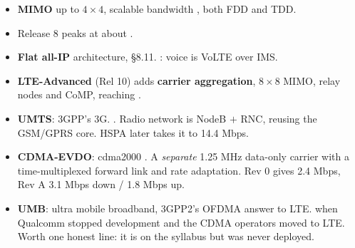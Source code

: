 {\begin{itemize}
        handset amplifier needs (Ch 4 \S4.6).
  \item \textbf{MIMO} up to $4\times4$, scalable bandwidth
        , both FDD and TDD.
  \item Release 8 peaks at about .
  \item \textbf{Flat all-IP} architecture, \S8.11. : voice is
        VoLTE over IMS.
  \item \textbf{LTE-Advanced} (Rel 10) adds \textbf{carrier aggregation}, $8\times8$ MIMO,
        relay nodes and CoMP, reaching .
\end{itemize}

\begin{itemize}
  \item \textbf{UMTS}: 3GPP's 3G. . Radio network is
        NodeB $+$ RNC, reusing the GSM/GPRS core. HSPA later takes it to 14.4 Mbps.
  \item \textbf{CDMA-EVDO}: cdma2000 . A
        \emph{separate} 1.25 MHz data-only carrier with a time-multiplexed forward link and
        rate adaptation. Rev 0 gives 2.4 Mbps, Rev A 3.1 Mbps down / 1.8 Mbps up.
  \item \textbf{UMB}: ultra mobile broadband, 3GPP2's OFDMA answer to LTE.
         when Qualcomm stopped development and the CDMA operators moved
        to LTE. Worth one honest line: it is on the syllabus but was never deployed. \added
\end{itemize}}

